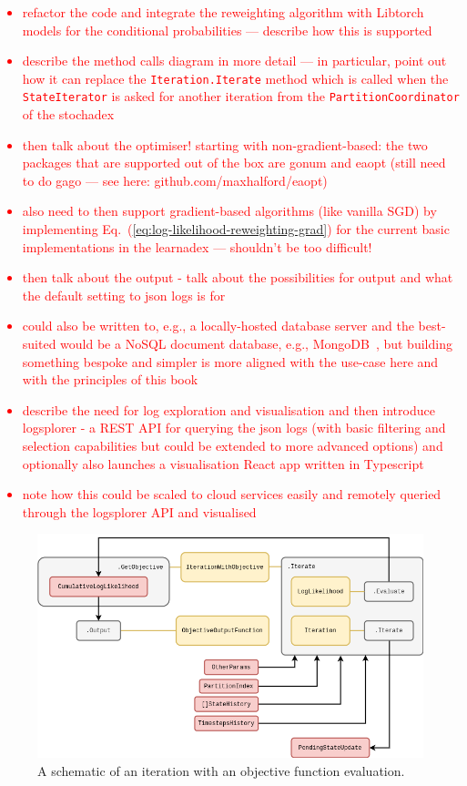 \textcolor{red}{\begin{itemize}
\item{refactor the code and integrate the reweighting algorithm with Libtorch models for the conditional probabilities --- describe how this is supported}
\item{describe the method calls diagram in more detail --- in particular, point out how it can replace the \texttt{Iteration.Iterate} method which is called when the \texttt{StateIterator} is asked for another iteration from the \texttt{PartitionCoordinator} of the stochadex}
\item{then talk about the optimiser! starting with non-gradient-based: the two packages that are supported out of the box are gonum and eaopt (still need to do gago --- see here: github.com/maxhalford/eaopt) }
\item{also need to then support gradient-based algorithms (like vanilla SGD) by implementing Eq.~(\ref{eq:log-likelihood-reweighting-grad}) for the current basic implementations in the learnadex --- shouldn't be too difficult!}
\item{then talk about the output - talk about the possibilities for output and what the default setting to json logs is for}
\item{could also be written to, e.g., a locally-hosted database server and the best-suited would be a NoSQL document database, e.g., MongoDB~\cite{mongodb}, but building something bespoke and simpler is more aligned with the use-case here and with the principles of this book}
\item{describe the need for log exploration and visualisation and then introduce logsplorer - a REST API for querying the json logs (with basic filtering and selection capabilities but could be extended to more advanced options) and optionally also launches a visualisation React app written in Typescript}
\item{note how this could be scaled to cloud services easily and remotely queried through the logsplorer API and visualised} 
\end{itemize}}

\begin{figure}[h]
\centering
\includegraphics[width=14cm]{images/chapter-3-learnadex-data-iterator.drawio.png}
\caption{A schematic of an iteration with an objective function evaluation.}
\label{fig:learnadex-data-iterator}
\end{figure}

